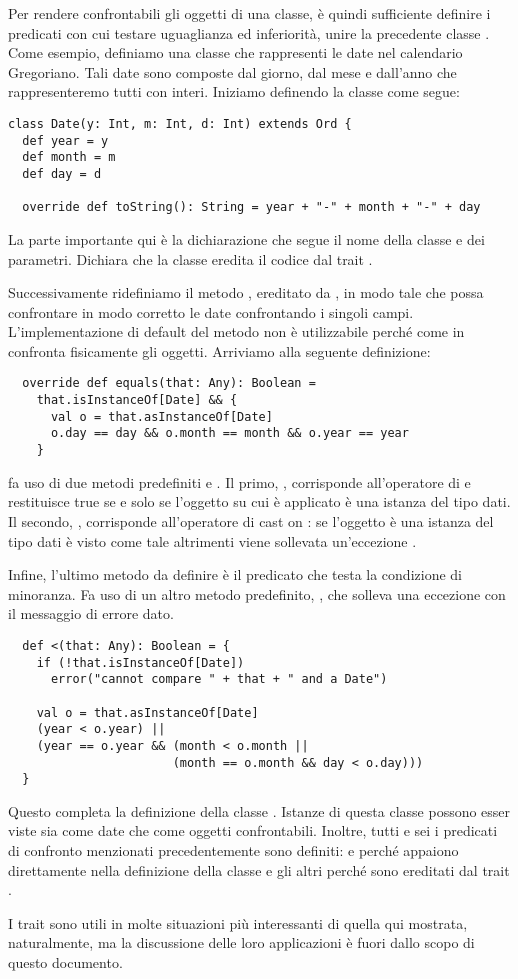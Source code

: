 Per rendere confrontabili gli oggetti di una classe, \`e quindi sufficiente definire i predicati con cui testare uguaglianza ed inferiorit\`a, unire la precedente classe . Come esempio, definiamo una classe  che rappresenti le date nel calendario Gregoriano. Tali date sono composte dal giorno, dal mese e dall'anno che rappresenteremo tutti con interi. Iniziamo definendo la classe  come segue:
\begin{lstlisting}
class Date(y: Int, m: Int, d: Int) extends Ord {
  def year = y
  def month = m
  def day = d

  override def toString(): String = year + "-" + month + "-" + day
\end{lstlisting}
La parte importante qui \`e la dichiarazione  che segue il nome della classe e dei parametri. Dichiara che la classe  eredita il codice dal trait .

Successivamente ridefiniamo il metodo , ereditato da , in modo tale che possa confrontare in modo corretto le date confrontando i singoli campi. L'implementazione di default del metodo  non \`e utilizzabile perch\'e come in \Java confronta fisicamente gli oggetti. Arriviamo alla seguente definizione:
\begin{lstlisting}
  override def equals(that: Any): Boolean =
    that.isInstanceOf[Date] && {
      val o = that.asInstanceOf[Date]
      o.day == day && o.month == month && o.year == year
    }
\end{lstlisting}
 fa uso di due metodi predefiniti  e . Il primo, , corrisponde all'operatore  di \Java e restituisce true se e solo se l'oggetto su cui \`e applicato \`e una istanza del tipo dati. Il secondo, , corrisponde all'operatore di cast on \Java: se l'oggetto \`e una istanza del tipo dati \`e visto come tale altrimenti viene sollevata un'eccezione \newline {}.

Infine, l'ultimo metodo da definire \`e il predicato che testa la condizione di minoranza. Fa uso di un altro metodo predefinito, , che solleva una eccezione con il messaggio di errore dato.
\begin{lstlisting}
  def <(that: Any): Boolean = {
    if (!that.isInstanceOf[Date])
      error("cannot compare " + that + " and a Date")

    val o = that.asInstanceOf[Date]
    (year < o.year) ||
    (year == o.year && (month < o.month ||
                       (month == o.month && day < o.day)))
  }
\end{lstlisting}
Questo completa la definizione della classe . Istanze di questa classe possono esser viste sia come date che come oggetti confrontabili.
Inoltre, tutti e sei i predicati di confronto menzionati precedentemente sono definiti:  e \code{<} perch\'e appaiono direttamente nella definizione della classe  e gli altri perch\'e sono ereditati dal trait .

I trait sono utili in molte situazioni pi\`u interessanti di quella qui mostrata, naturalmente, ma la discussione delle loro applicazioni \`e fuori dallo scopo di questo documento.